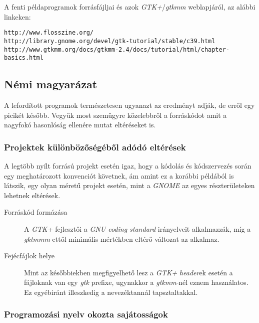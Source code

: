 A fenti példaprogramok forrásfájljai és azok \textit{GTK+}/\textit{gtkmm} weblapjáról, az alábbi linkeken:

\begin{verbatim}
http://www.flosszine.org/
http://library.gnome.org/devel/gtk-tutorial/stable/c39.html
http://www.gtkmm.org/docs/gtkmm-2.4/docs/tutorial/html/chapter-basics.html
\end{verbatim}

\subsection{Némi magyarázat}

A lefordított programok természetesen ugyanazt az eredményt adják, de erről egy picikét később. Vegyük most szemügyre közelebbről a forráskódot amit a nagyfokó hasonlóság ellenére mutat eltéréseket is.

\subsubsection{Projektek különbözőségéből adódó eltérések}

A legtöbb nyílt forrású projekt esetén igaz, hogy a kódolás és kódszervezés során egy meghatározott konvenciót követnek, ám amint ez a korábbi példából is látszik, egy olyan méretű projekt esetén, mint a \textit{GNOME} az egyes részterületeken lehetnek eltérések.

\begin{description}
 \item[Forráskód formázása] A \textit{GTK+} fejlesztői a \textit{GNU coding standard} irányelveit alkalmazzák, míg a \textit{gktmmm} ettől minimális mértékben eltérő változat az alkalmaz.

 \item[Fejécfájlok helye] Mint az későbbiekben megfigyelhető lesz a \textit{GTK+} \textit{header}ek esetén a fájloknak van egy \textit{gtk} prefixe, ugynakkor a \textit{gtkmm}-nél eznem használatos. Ez egyébiránt illeszkedig a nevezéktannál tapsztaltakkal.
 \end{description}

\subsubsection{Programozási nyelv okozta sajátosságok}


